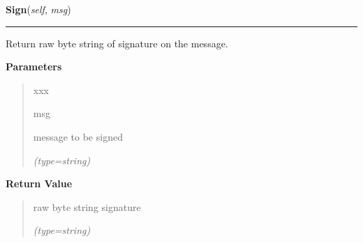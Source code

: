 \hspace{.8\funcindent}\begin{boxedminipage}{\funcwidth}

    \raggedright \textbf{Sign}(\textit{self}, \textit{msg})

    \vspace{-1.5ex}

    \rule{\textwidth}{0.5\fboxrule}
\setlength{\parskip}{2ex}
    Return raw byte string of signature on the message.

\setlength{\parskip}{1ex}
      \textbf{Parameters}
      \vspace{-1ex}

      \begin{quote}
        \begin{Ventry}{xxx}

          \item[msg]

          message to be signed

            {\it (type=string)}

        \end{Ventry}

      \end{quote}

      \textbf{Return Value}
    \vspace{-1ex}

      \begin{quote}
      raw byte string signature

      {\it (type=string)}

      \end{quote}

    \end{boxedminipage}

    \label{keyczar:keys:HmacKey:Verify}

    \vspace{0.5ex}

